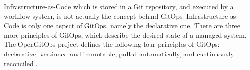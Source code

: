 %
%

%

Infrastructure-as-Code which is stored in a Git repository,
and executed by a workflow system,
is not actually the concept behind GitOps.
Infrastructure-as-Code is only one aspect of GitOps, namely the declarative one.
There are three more principles of GitOps, which describe the desired state of a managed system.
The OpenGitOps project defines the following four principles of GitOps:
declarative, versioned and immutable, pulled automatically, and continuously reconciled
\autocite{gitopsPrinciplesv100}.



